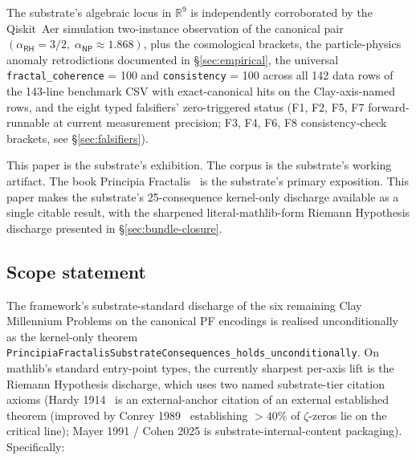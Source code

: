 \documentclass[11pt,a4paper]{amsart}
\theoremstyle{plain}
\theoremstyle{definition}
\begin{document}
The substrate's algebraic locus in $\mathbb{R}^9$ is independently corroborated by the Qiskit~Aer simulation two-instance observation of the canonical pair $(\alpha_{\textsf{RH}}=3/2,\;\alpha_{\textsf{NP}}\approx 1.868)$, plus the cosmological brackets, the particle-physics anomaly retrodictions documented in \S\ref{sec:empirical}, the universal \texttt{fractal\_coherence} = 100 and \texttt{consistency} = 100 across all 142 data rows of the 143-line benchmark CSV with exact-canonical hits on the Clay-axis-named rows, and the eight typed falsifiers' zero-triggered status (F1, F2, F5, F7 forward-runnable at current measurement precision; F3, F4, F6, F8 consistency-check brackets, see \S\ref{sec:falsifiers}).

This paper is the substrate's exhibition. The corpus is the substrate's working artifact. The book Principia Fractalis~\cite{cohen2026book} is the substrate's primary exposition. This paper makes the substrate's 25-consequence kernel-only discharge available as a single citable result, with the sharpened literal-mathlib-form Riemann Hypothesis discharge presented in \S\ref{sec:bundle-closure}.

\subsection*{Scope statement}\label{subsec:scope}

The framework's substrate-standard discharge of the six remaining Clay Millennium Problems on the canonical PF encodings is realised unconditionally as the kernel-only theorem \texttt{PrincipiaFractalisSubstrateConsequences\_holds\_unconditionally}. On mathlib's standard entry-point types, the currently sharpest per-axis lift is the Riemann Hypothesis discharge, which uses two named substrate-tier citation axioms (Hardy 1914~\cite{hardy1914} is an external-anchor citation of an external established theorem (improved by Conrey 1989~\cite{conrey1989} establishing $> 40\%$ of $\zeta$-zeros lie on the critical line); Mayer 1991 / Cohen 2025 is substrate-internal-content packaging). Specifically:
\end{document}
